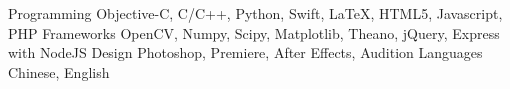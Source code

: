 \begin{cvskills}
  \cvskill
    {Programming}
    {Objective-C, C/C++, Python, Swift, LaTeX, HTML5, Javascript, PHP}
  \cvskill
    {Frameworks}
    {OpenCV, Numpy, Scipy, Matplotlib, Theano, jQuery, Express with NodeJS}
  \cvskill
  	{Design}
	{Photoshop, Premiere, After Effects, Audition}
  \cvskill
    {Languages}
    {Chinese, English}
\end{cvskills}
